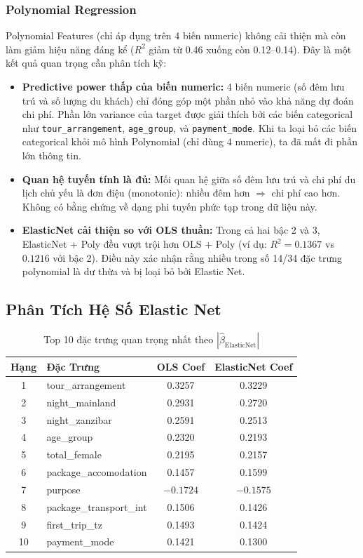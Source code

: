 \documentclass[12pt,a4paper]{article}
\begin{document}
\subsubsection{Polynomial Regression}

Polynomial Features (chỉ áp dụng trên 4 biến numeric) không cải thiện mà còn làm giảm hiệu năng đáng kể ($R^2$ giảm từ 0.46 xuống còn 0.12--0.14). Đây là một kết quả quan trọng cần phân tích kỹ:

\begin{itemize}[leftmargin=1.5em]
    \item \textbf{Predictive power thấp của biến numeric:} 4 biến numeric (số đêm lưu trú và số lượng du khách) chỉ đóng góp một phần nhỏ vào khả năng dự đoán chi phí. Phần lớn variance của target được giải thích bởi các biến categorical như \texttt{tour\_arrangement}, \texttt{age\_group}, và \texttt{payment\_mode}. Khi ta loại bỏ các biến categorical khỏi mô hình Polynomial (chỉ dùng 4 numeric), ta đã mất đi phần lớn thông tin.
    \item \textbf{Quan hệ tuyến tính là đủ:} Mối quan hệ giữa số đêm lưu trú và chi phí du lịch chủ yếu là đơn điệu (monotonic): nhiều đêm hơn $\Rightarrow$ chi phí cao hơn. Không có bằng chứng về dạng phi tuyến phức tạp trong dữ liệu này.
    \item \textbf{ElasticNet cải thiện so với OLS thuần:} Trong cả hai bậc 2 và 3, ElasticNet + Poly đều vượt trội hơn OLS + Poly (ví dụ: $R^2 = 0.1367$ vs $0.1216$ với bậc 2). Điều này xác nhận rằng nhiều trong số 14/34 đặc trưng polynomial là dư thừa và bị loại bỏ bởi Elastic Net.
\end{itemize}

\subsection{Phân Tích Hệ Số Elastic Net}

\begin{table}[H]
\centering
\caption{Top 10 đặc trưng quan trọng nhất theo $|\hat{\beta}_{\text{ElasticNet}}|$}
\label{tab:coef_table}
\begin{tabular}{c l c c}
\toprule
\textbf{Hạng} & \textbf{Đặc Trưng} & \textbf{OLS Coef} & \textbf{ElasticNet Coef} \\
\midrule
1  & tour\_arrangement   &  0.3257 &  0.3229 \\
2  & night\_mainland     &  0.2931 &  0.2720 \\
3  & night\_zanzibar     &  0.2591 &  0.2513 \\
4  & age\_group          &  0.2320 &  0.2193 \\
5  & total\_female       &  0.2195 &  0.2157 \\
6  & package\_accomodation & 0.1457 &  0.1599 \\
7  & purpose            & $-0.1724$ & $-0.1575$ \\
8  & package\_transport\_int & 0.1506 &  0.1426 \\
9  & first\_trip\_tz     &  0.1493 &  0.1424 \\
10 & payment\_mode       &  0.1421 &  0.1300 \\
\bottomrule
\end{tabular}
\end{table}
\end{document}
